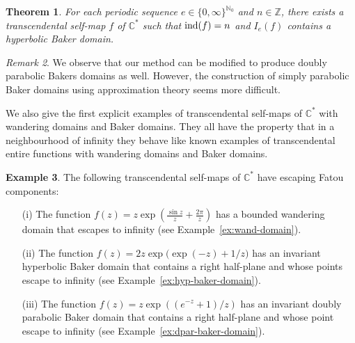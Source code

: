 \documentclass[a4paper, 12pt, reqno]{amsart}
\numberwithin{equation}{section}
\newcommand{\red}[1]{{\color{red} #1}}
\theoremstyle{plain}
\newtheorem{thm}{Theorem}[section]
\theoremstyle{definition}
\newtheorem{ex}[thm]{Example}
\theoremstyle{remark}
\newtheorem{rmk}[thm]{Remark}
\newcommand{\C}{{\mathbb{C}}}
\newcommand{\Z}{{\mathbb{Z}}}
\newcommand{\N}{{\mathbb{N}}}
\begin{document}
\begin{thm}
\label{thm:baker-domains}
For each periodic sequence $e\in\{0,\infty\}^{\N_0}$ and $n\in\Z$, there exists a trans\-cendental self-map $f$ of $\C^*$ such that $\textup{ind}(f)=n$ and $I_e(f)$ contains a hyperbolic Baker domain. 
\end{thm}

\begin{rmk}
We observe that our method can be modified to produce doubly parabolic Bakers domains as well. However, the cons\-truction of simply parabolic Baker domains using approximation theory seems more difficult.
\end{rmk}


We also give the first explicit examples of transcendental self-maps of $\C^*$ with wandering domains and Baker domains. They all have the property that in a neighbourhood of infinity they behave like known examples of transcendental entire functions with wandering domains and Baker domains.

\begin{ex}
\label{ex:main-ex}
The following transcendental self-maps of $\C^*$ have escaping Fatou components:
\begin{enumerate}
\item[(i)] The function $f(z)=z\exp\left(\frac{\sin z}{z}+\frac{2\pi}{z}\right)$ has a bounded wandering domain that escapes to infinity (see Example~\ref{ex:wand-domain}).
\item[(ii)] The function $f(z)=2z\exp\bigl(\exp(-z)+1/z\bigr)$ has an invariant hyperbolic Baker domain that contains a right half-plane and whose points escape to infinity (see Example~\ref{ex:hyp-baker-domain}).
\item[(iii)] The function $f(z)=z\exp\left((e^{-z}+1)/z\right)$ has an invariant doubly parabolic Baker domain that contains a right half-plane and whose point escape to infinity (see Example~\ref{ex:dpar-baker-domain}).
\end{enumerate}
\end{ex} 
\end{document}
